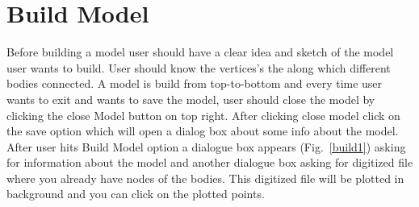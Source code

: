 \documentclass[12pt]{article}
\begin{document}
\section{Build Model}
Before building a model user should have a clear idea and sketch of the model user wants to build. User should know the vertices's the along which different bodies connected. A model is build from top-to-bottom and every time user wants to exit and wants to save the model, user should close the model by clicking the close Model button on top right. After clicking close model click on the save option which will open a dialog box about some info about the model.\\
After user hits Build Model option a dialogue box appears (Fig.~\ref{build1})
asking for information about the model and another dialogue box asking for digitized file where you already have nodes of the bodies. This digitized file will be plotted in background and you can click on the plotted points. 
\end{document}
